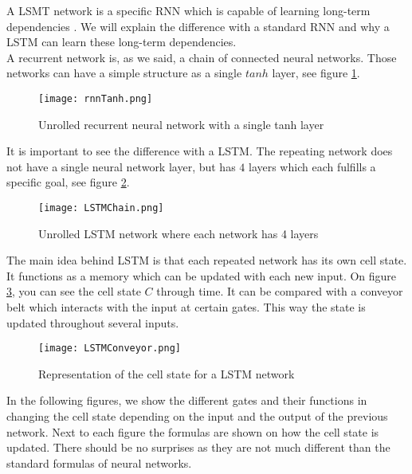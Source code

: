 A LSMT network is a specific RNN which is capable of learning long-term dependencies \cite{lstmDep:thesis}. We will explain the difference with a standard RNN and why a LSTM can learn these long-term dependencies. \\

A recurrent network is, as we said, a chain of connected neural networks. Those networks can have a simple structure as a single $tanh$ layer, see figure \ref{fig:rnnTanh}.

\begin{figure}[H]
	\centering
	\texttt{[image: rnnTanh.png]}
	\caption{Unrolled recurrent neural network with a single tanh layer \cite{lstmGood:online}}
	\label{fig:rnnTanh}
\end{figure} 

It is important to see the difference with a LSTM. The repeating network does not have a single neural network layer, but has $4$ layers which each fulfills a specific goal, see figure \ref{fig:LSTMChain}.

\begin{figure}[H]
	\centering
	\texttt{[image: LSTMChain.png]}
	\caption{Unrolled LSTM network where each network has 4 layers \cite{lstmGood:online}}
	\label{fig:LSTMChain}
\end{figure} 

The main idea behind LSTM is that each repeated network has its own cell state. It functions as a  memory which can be updated with each new input. On figure \ref{fig:LSTMConveyor}, you can see the cell state $C$ through time. It can be compared with a conveyor belt which interacts with the input at certain gates. This way the state is updated throughout several inputs.

\begin{figure}[H]
	\centering
	\texttt{[image: LSTMConveyor.png]}
	\caption{Representation of the cell state for a LSTM network \cite{lstmGood:online}}
	\label{fig:LSTMConveyor}
\end{figure} 

In the following figures, we show the different gates and their functions in changing the cell state depending on the input and the output of the previous network. Next to each figure the formulas are shown on how the cell state is updated. There should be no surprises as they are not much different than the standard formulas of neural networks. \\

